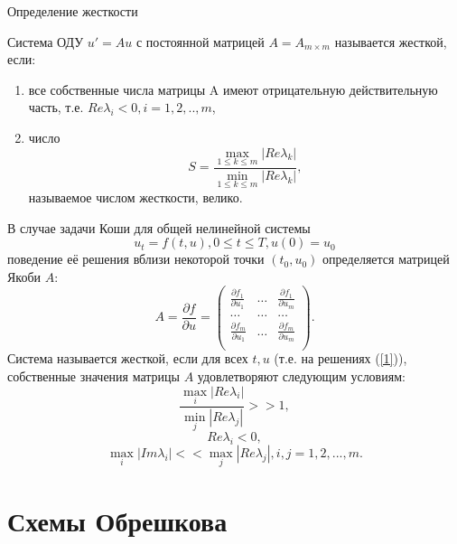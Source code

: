 \documentclass[ignorenonframetext,unicode,handout, 9pt]{beamer}
\begin{document}
\begin{frame}[t]{Определение жесткости}

Система ОДУ $u' = Au$ с постоянной матрицей $A = A_{m \times m}$ называется жесткой, если:
\begin{enumerate}
  \item{все собственные числа матрицы A имеют отрицательную действительную часть, т.е. $Re\lambda_i < 0, i = 1,2,..,m$},
  \item{число}
  $$S = \frac{\max\limits_{1 \leqslant k \leqslant m}|Re\lambda_k|}{\min\limits_{1 \leqslant k \leqslant m}|Re\lambda_k|},$$
  называемое числом жесткости, велико.
  \end{enumerate}

  \end{frame}
  \begin{frame}[t]

  В случае задачи Коши для общей нелинейной системы
\begin{equation}\label{1}
 u_t =f(t,u), 0 \leqslant t \leqslant T, u(0) = u_0
\end{equation}
поведение её решения вблизи некоторой точки $(t_0,u_0)$ определяется матрицей Якоби $A:$
$$A = \frac{\partial f}{\partial u} =
\left(
\begin{array}{ccc}
\frac{\partial f_1}{\partial u_1} & \ldots & \frac{\partial f_1}{\partial u_m} \\
\ldots & \ldots & \ldots \\
\frac{\partial f_m}{\partial u_1} & \ldots & \frac{\partial f_m}{\partial u_m} \\
\end{array}
\right).
$$
Система называется жесткой, если для всех $t,u$ (т.е. на решениях (\ref{1})), собственные значения матрицы $A$ удовлетворяют следующим условиям:
$$\frac{\max\limits_i |Re \lambda_i|}{\min\limits_j |Re \lambda_j|} >> 1,$$
$$Re \lambda_i < 0,$$
$$\max_i |Im \lambda_i| <<  \max_j |Re \lambda_j|, i,j = 1,2,...,m.$$

\end{frame}

\section[Схемы Обрешкова]{Схемы Обрешкова}
\end{document}
